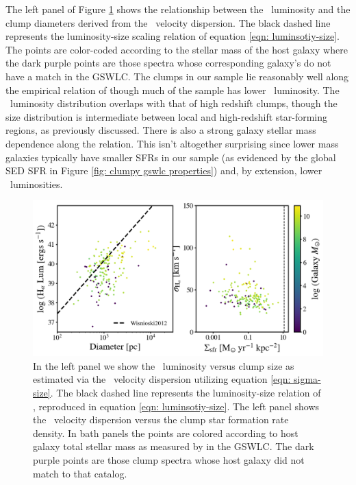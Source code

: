 The left panel of Figure \ref{fig: clump scatter plots} shows the relationship between the \ha~luminosity and the clump diameters derived from the \ha~velocity dispersion. The black dashed line represents the luminosity-size scaling relation of equation \ref{eqn: luminsotiy-size}. The points are color-coded according to the stellar mass of the host galaxy where the dark purple points are those spectra whose corresponding galaxy's do not have a match in the GSWLC. The clumps in our sample lie reasonably well along the empirical relation of \cite{Wisnioski2012} though much of the sample has lower \ha~luminosity. The \ha~luminosity distribution overlaps with that of high redshift clumps, though the size distribution is intermediate between local and high-redshift star-forming regions, as previously discussed. There is also a strong galaxy stellar mass dependence along the relation. This isn't altogether surprising since lower mass galaxies typically have smaller SFRs in our sample (as evidenced by the global SED SFR in Figure \ref{fig: clumpy gswlc properties}) and, by extension, lower \ha~luminosities. 

\begin{figure}
\centering
\includegraphics[width=\textwidth]{Figures/clump_relations.png}
\caption[Clump properties: $L(\mathrm{H}_{\alpha})$ vs size and $\sigma_{H_{\alpha}}$ vs $\Sigma_{SFR}$]{In the left panel we show the \ha~luminosity versus clump size as estimated via the \ha~velocity dispersion utilizing equation \ref{eqn: sigma-size}. The black dashed line represents the luminosity-size relation of \cite{Wisnioski2012}, reproduced in equation \ref{eqn: luminsotiy-size}. The left panel shows the \ha~velocity dispersion versus the clump star formation rate density. In bath panels the points are colored according to host galaxy total stellar mass as measured by \cite{Salim2016} in the GSWLC. The dark purple points are those clump spectra whose host galaxy did not match to that catalog.}
\label{fig: clump scatter plots}
\end{figure}

